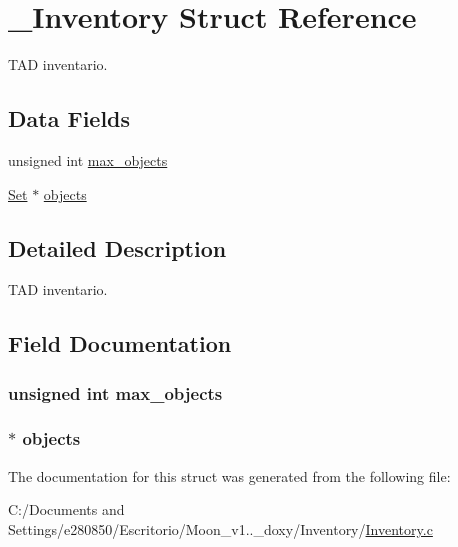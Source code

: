 \hypertarget{struct___inventory}{\section{\+\_\+\+Inventory Struct Reference}
\label{struct___inventory}
}


T\+A\+D inventario.  


\subsection*{Data Fields}
\begin{DoxyCompactItemize}
\item 
unsigned int \hyperlink{struct___inventory_a6d4909df00b2d484aade9a129624541b}{max\+\_\+objects}
\item 
\hyperlink{_set_8h_a6d3b7f7c92cbb4577ef3ef7ddbf93161}{Set} $\ast$ \hyperlink{struct___inventory_ac26770627494dfcedbe3f227abc3c8a7}{objects}
\end{DoxyCompactItemize}


\subsection{Detailed Description}
T\+A\+D inventario. 


\begin{DoxyItemize}
\item 
\end{DoxyItemize}

\subsection{Field Documentation}
\hypertarget{struct___inventory_a6d4909df00b2d484aade9a129624541b}{
\subsubsection[{max\+\_\+objects}]{\setlength{\rightskip}{0pt plus 5cm}unsigned int max\+\_\+objects}}\label{struct___inventory_a6d4909df00b2d484aade9a129624541b}
\hypertarget{struct___inventory_ac26770627494dfcedbe3f227abc3c8a7}{
\subsubsection[{objects}]{$\ast$ objects}}\label{struct___inventory_ac26770627494dfcedbe3f227abc3c8a7}


The documentation for this struct was generated from the following file\+:\begin{DoxyCompactItemize}
\item 
C\+:/\+Documents and Settings/e280850/\+Escritorio/\+Moon\+\_\+v1..\+\_\+doxy/\+Inventory/\hyperlink{_inventory_8c}{Inventory.\+c}\end{DoxyCompactItemize}
